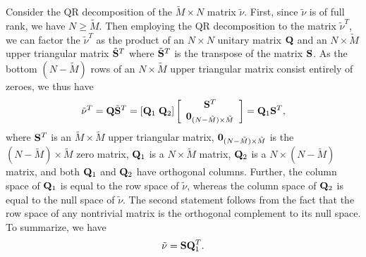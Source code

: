 \documentclass[ amsmath,amssymb,nofootinbib
]{revtex4-1}
\newcommand{\be}{\begin{equation}}
\newcommand{\ee}{\end{equation}}
\newcommand{\bQ}{{\bf Q}}
\newcommand{\bS}{{\bf S}}
\newcommand{\tM}{{\tilde M}}
\newcommand{\tnu}{{\tilde \nu}}
\begin{document}
Consider the QR decomposition of the $\tM \times N$ matrix $\tnu$.
First, since  $\tnu$ is of full rank, we have $N \ge \tM$.
Then employing the QR decomposition  to the matrix $\tnu^T$,
we can factor the $\tnu^T$
as the product of an $N \times N$ unitary matrix $\bQ$
and an $N \times \tM$ upper triangular matrix $\tilde{\bS}^T$
where $\tilde{\bS}^T$ is the transpose of the matrix $\bS$.
As the bottom $(N - \tM)$ rows of an $N \times \tM$ upper triangular matrix consist entirely of zeroes,
we thus have
$$
   \tnu^T  = \bQ \tilde{\bS}^T = [\bQ_1  \;  \bQ_2]
                  \left[\begin{array}{c}
                      \bS^T \\
                      {\bf 0}_{(N - \tM) \times \tM}\\
                    \end{array}\right]
                = \bQ_1  \bS^T,
$$
where $\bS^T$ is an $\tM\times \tM$ upper triangular matrix, ${\bf 0}_{(N - \tM) \times \tM}$ is the $(N - \tM) \times \tM$ zero matrix,
$\bQ_1$ is a $N \times \tM$ matrix, $\bQ_2$ is a $N \times (N - \tM)$ matrix, and both $\bQ_1$ and $\bQ_2$ have orthogonal columns.
Further, the column space of $\bQ_1$ is equal to the row space of $\tnu$,
whereas  the column space of $\bQ_2$ is equal to the null space of $\tnu$.
The second statement  follows from the fact
that the row space of any nontrivial matrix is the orthogonal complement to its null space.
To summarize, we have
\be
   \tnu =  \bS \bQ_1^T.
\ee


\end{document}
